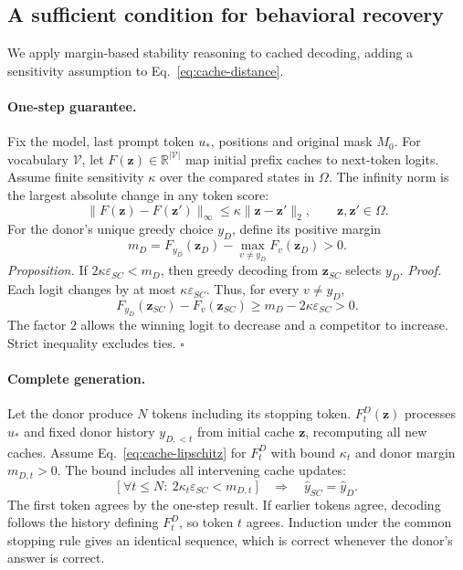 \subsection{A sufficient condition for behavioral recovery}
\label{app:behavior-recovery}

We apply margin-based stability reasoning \citep{tsuzuku2018lipschitz}
to cached decoding, adding a sensitivity assumption to Eq.~\eqref{eq:cache-distance}.

\paragraph{One-step guarantee.}
Fix the model, last prompt token $u_*$, positions and original mask $M_0$.
For vocabulary $\mathcal V$, let $F(\mathbf z)\in\mathbb R^{|\mathcal V|}$
map initial prefix caches to next-token logits. Assume finite sensitivity
$\kappa$ over the compared states in $\Omega$. The infinity norm is the
largest absolute change in any token score:
\begin{equation}
\|F(\mathbf z)-F(\mathbf z')\|_\infty
\le\kappa\|\mathbf z-\mathbf z'\|_2,\qquad
\mathbf z,\mathbf z'\in\Omega.
\label{eq:cache-lipschitz}
\end{equation}
For the donor's unique greedy choice $y_D$, define its positive margin
\begin{equation}
m_D=F_{y_D}(\mathbf z_D)-\max_{v\ne y_D}F_v(\mathbf z_D)>0.
\label{eq:donor-margin}
\end{equation}
\emph{Proposition.} If $2\kappa\varepsilon_{SC}<m_D$, then greedy
decoding from $\mathbf z_{SC}$ selects $y_D$.
\emph{Proof.} Each logit changes by at most
$\kappa\varepsilon_{SC}$. Thus, for every $v\ne y_D$,
\begin{equation}
F_{y_D}(\mathbf z_{SC})-F_v(\mathbf z_{SC})
\ge m_D-2\kappa\varepsilon_{SC}>0.
\label{eq:margin-preservation}
\end{equation}
The factor $2$ allows the winning logit to decrease and a competitor
to increase. Strict inequality excludes ties. \hfill$\square$

\paragraph{Complete generation.}
Let the donor produce $N$ tokens including its stopping token.
$F_t^D(\mathbf z)$ processes $u_*$ and fixed donor history $y_{D,<t}$
from initial cache $\mathbf z$, recomputing all new caches.
Assume Eq.~\eqref{eq:cache-lipschitz} for $F_t^D$ with bound $\kappa_t$
and donor margin $m_{D,t}>0$. The bound includes all intervening cache updates:
\begin{equation}
\bigl[\ \forall t\le N:\ 2\kappa_t\varepsilon_{SC}<m_{D,t}\ \bigr]
\quad\Longrightarrow\quad \hat y_{SC}=\hat y_D.
\label{eq:sequence-recovery}
\end{equation}
The first token agrees by the one-step result. If earlier tokens agree,
decoding follows the history defining $F_t^D$, so token $t$ agrees.
Induction under the common stopping rule gives an identical sequence,
which is correct whenever the donor's answer is correct.

